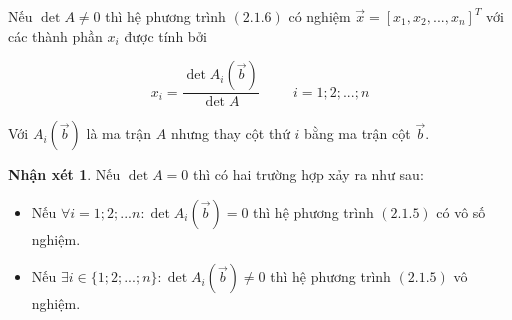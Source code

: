 \documentclass[12pt,a4paper,oneside]{book}
\theoremstyle{theorem}
\theoremstyle{definition}
\newtheorem{nx}[theorem2]{Nhận xét}
\begin{document}
    Nếu $\det{A}\neq 0$ thì hệ phương trình $(2.1.6)$ có nghiệm $\vec{x}=[x_1,x_2,...,x_n]^T$ với các thành phần $x_i$ được tính bởi

   \[
x_i = \frac{\det A_i(\vec{b})}{\det A} \hspace{1cm} i=1;2;...;n
\]

Với $ A_i(\vec{b})$ là ma trận $A$ nhưng thay cột thứ $i$ bằng ma trận cột $\vec{b}$.
\begin{nx}
    Nếu $\det{A}= 0$ thì có hai trường hợp xảy ra như sau:
    \begin{itemize}
        \item Nếu $\forall i=1;2;...n: \det A_i(\vec{b})=0 $ thì hệ phương trình $(2.1.5)$ có vô số nghiệm.
        \item Nếu $\exists i\in \{1;2;...;n\}:\det A_i(\vec{b})\neq0  $ thì hệ phương trình $(2.1.5)$ vô nghiệm.
     \end{itemize}
\end{nx}
\end{document}
